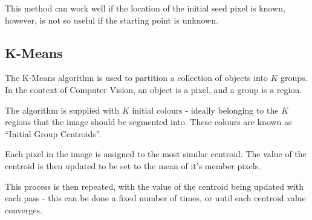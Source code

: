 This method can work well if the location of the initial seed pixel is known, however, is not so useful if the starting point is unknown.

\subsection{K-Means}
The K-Means algorithm is used to partition a collection of objects into $K$ groups. In the context of Computer Vision, an object is a pixel, and a group is a region.

The algorithm is supplied with $K$ initial colours - ideally belonging to the $K$ regions that the image should be segmented into. These colours are known as ``Initial Group Centroids''.

Each pixel in the image is assigned to the most similar centroid. The value of the centroid is then updated to be set to the mean of it's member pixels.

This process is then repeated, with the value of the centroid being updated with each pass - this can be done a fixed number of times, or until each centroid value converges.

